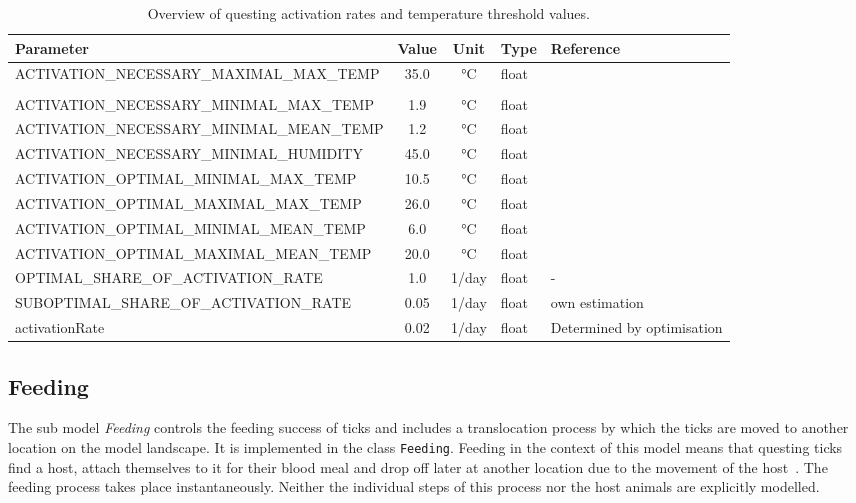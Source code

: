 \documentclass[a4paper, 11pt]{scrartcl}
\newcommand{\inlinecode}[1]{\texttt{\small #1}}
\begin{document}
\begin{table}[h!]
\caption[Overview of questing activation rates and temperature threshold values.]{Overview of questing activation rates and temperature threshold values.}
\label{tab:activation_parameters}
\begin{tabularx}{\textwidth}{lccll}
\toprule
\textbf{Parameter}	& \textbf{Value} & \textbf{Unit}	& \textbf{Type}	& \textbf{Reference} \\
\midrule
\multirow{2}{*}{\tiny{ACTIVATION\_NECESSARY\_MAXIMAL\_MAX\_TEMP}}	& \multirow{2}{*}{35.0}  & \multirow{2}{*}{°C} & \multirow{2}{*}{float} & ~\textcite{Gray.2016} \\
												    &		&	 &		 & \textcite{MacLeod.1935} \\
\tiny{ACTIVATION\_NECESSARY\_MINIMAL\_MAX\_TEMP}	&  1.9  & °C & float & \textcite{Perret.2000} \\
\tiny{ACTIVATION\_NECESSARY\_MINIMAL\_MEAN\_TEMP}&  1.2 	& °C & float & \textcite{Perret.2000} \\
\tiny{ACTIVATION\_NECESSARY\_MINIMAL\_HUMIDITY}	& 45.0  & °C & float & \textcite{Greenfield.2011} \\
\tiny{ACTIVATION\_OPTIMAL\_MINIMAL\_MAX\_TEMP}	& 10.5 	& °C & float & \textcite{Perret.2000} \\
\tiny{ACTIVATION\_OPTIMAL\_MAXIMAL\_MAX\_TEMP}	& 26.0  & °C & float & \textcite{Greenfield.2011} \\
\tiny{ACTIVATION\_OPTIMAL\_MINIMAL\_MEAN\_TEMP}	&  6.0  & °C & float & \textcite{Gilbert.2014}	\\
\tiny{ACTIVATION\_OPTIMAL\_MAXIMAL\_MEAN\_TEMP}	& 20.0 	& °C & float & \tiny{\textcite{Kubiak.2006}} \\
\midrule
\tiny{OPTIMAL\_SHARE\_OF\_ACTIVATION\_RATE}		&  1.0  & 1/day & float	& - \\
\tiny{SUBOPTIMAL\_SHARE\_OF\_ACTIVATION\_RATE}	&  0.05	& 1/day & float	& own estimation \\
\small{activationRate}	   						&  0.02 & 1/day & float	& \small{Determined by optimisation} \\
\bottomrule
\end{tabularx}
\end{table}

\subsection{Feeding}\label{feeding}
The sub model \emph{Feeding} controls the feeding success of ticks and includes a translocation process by which the ticks are moved to another location on the model landscape. It is implemented in the class \inlinecode{Feeding}. Feeding in the context of this model means that questing ticks find a host, attach themselves to it for their blood meal and drop off later at another location due to the movement of the host~\parencite{Medlock.2013}. The feeding process takes place instantaneously. Neither the individual steps of this process nor the host animals are explicitly modelled.
\end{document}
